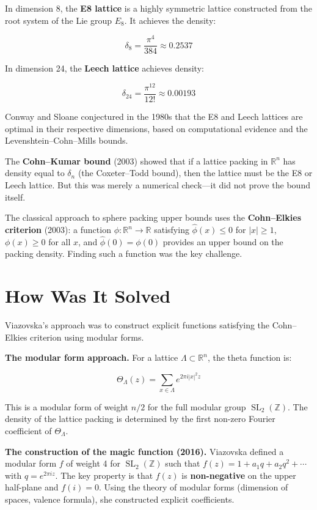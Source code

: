 In dimension 8, the \textbf{E8 lattice} is a highly symmetric lattice constructed from the root system of the Lie group $E_8$. It achieves the density:

\[
\delta_8 = \frac{\pi^4}{384} \approx 0.2537
\]

In dimension 24, the \textbf{Leech lattice} achieves density:

\[
\delta_{24} = \frac{\pi^{12}}{12!} \approx 0.00193
\]

Conway and Sloane conjectured in the 1980s that the E8 and Leech lattices are optimal in their respective dimensions, based on computational evidence and the Levenshtein--Cohn--Mills bounds.

The \textbf{Cohn--Kumar bound} (2003) showed that if a lattice packing in $\mathbb{R}^n$ has density equal to $\delta_n$ (the Coxeter--Todd bound), then the lattice must be the E8 or Leech lattice. But this was merely a numerical check---it did not prove the bound itself.

The classical approach to sphere packing upper bounds uses the \textbf{Cohn--Elkies criterion} (2003): a function $\phi: \mathbb{R}^n \to \mathbb{R}$ satisfying $\widehat{\phi}(x) \le 0$ for $|x| \ge 1$, $\phi(x) \ge 0$ for all $x$, and $\widehat{\phi}(0) = \phi(0)$ provides an upper bound on the packing density. Finding such a function was the key challenge.

\section{How Was It Solved}

Viazovska's approach was to construct explicit functions satisfying the Cohn--Elkies criterion using modular forms.

\textbf{The modular form approach.} For a lattice $\Lambda \subset \mathbb{R}^n$, the theta function is:

\[
\Theta_\Lambda(z) = \sum_{x \in \Lambda} e^{2\pi i |x|^2 z}
\]

This is a modular form of weight $n/2$ for the full modular group $\operatorname{SL}_2(\mathbb{Z})$. The density of the lattice packing is determined by the first non-zero Fourier coefficient of $\Theta_\Lambda$.

\textbf{The construction of the magic function (2016).} Viazovska defined a modular form $f$ of weight 4 for $\operatorname{SL}_2(\mathbb{Z})$ such that $f(z) = 1 + a_1 q + a_2 q^2 + \cdots$ with $q = e^{2\pi i z}$. The key property is that $f(z)$ is \textbf{non-negative} on the upper half-plane and $f(i) = 0$. Using the theory of modular forms (dimension of spaces, valence formula), she constructed explicit coefficients.

